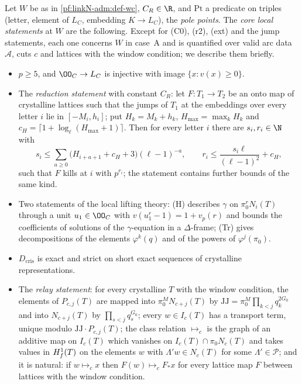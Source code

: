 \begin{definition}\label{pf:linkN-adm:def-cores}
Let $W$ be as in \cref{pf:linkN-adm:def-wc}, $C_R\in\R$, and $\mathrm{Pt}$ a predicate on triples (letter, element of
$L_C$, embedding $K\to L_C$), the \emph{pole points}. The \emph{core local statements} at $W$ are the following. Except
for (C0), (r2), (ext) and the jump statements, each one concerns $W$ in case~A and is quantified over valid arc data
$\mathcal A$, cuts $c$ and lattices with the window condition; we describe them briefly.
\begin{itemize}
\item[(C0)] $p\ge5$, and $\OO_C\to L_C$ is injective with image $\{x:v(x)\ge0\}$.
\item[(wr)] The \emph{reduction statement} with constant $C_R$: let $F\colon T_1\to T_2$ be an onto map of crystalline
  lattices such that the jumps of $T_1$ at the embeddings over every letter $i$ lie in $[-M_i,h_i]$; put $H_k=M_k+h_k$,
  $H_{\max}=\max_kH_k$ and $c_H=\lceil1+\log_\ell(H_{\max}+1)\rceil$. Then for every letter $i$ there are
  $s_i,r_i\in\N$ with
  \[
  s_i\le\sum_{a\ge0}\bigl(H_{i+a+1}+c_H+3\bigr)(\ell-1)^{-a},\qquad r_i\le\frac{s_i\ell}{(\ell-1)^2}+c_H,
  \]
  such that $F$ kills at $i$ with $p^{r_i}$; the statement contains further bounds of the same kind.
\item[(H), (Tr)] Two statements of the local lifting theory: (H) describes $\gamma$ on $\pi_0^rN_i(T)$ through a unit
  $u_1\in\OO_C$ with $v(u_1^r-1)=1+v_p(r)$ and bounds the coefficients of solutions of the $\gamma$-equation in a
  $\Delta$-frame; (Tr) gives decompositions of the elements $\varphi^k(q)$ and of the powers of $\varphi^j(\pi_0)$.
\item[(dc)] $D_{\mathrm{cris}}$ is exact and strict on short exact sequences of crystalline representations.
\item[(relay)] The \emph{relay statement}: for every crystalline $T$ with the window condition, the elements of
  $P_{c,j}(T)$ are mapped into $\pi_0^MN_{c+j}(T)$ by $\mathrm{JJ}=\pi_0^M\prod_{k<j}q_k^{2G_0}$ and into $N_{c+j}(T)$ by
  $\prod_{s<j}q_s^{G_0}$; every $w\in I_c(T)$ has a transport term, unique modulo $\mathrm{JJ}\cdot P_{c,j}(T)$; the class
  relation $\mapsto_c$ is the graph of an additive map on $I_c(T)$ which vanishes on $I_c(T)\cap\pi_0N_c(T)$ and takes
  values in $H^1_{f}(T)$ on the elements $w$ with $\Lambda'w\in N_c(T)$ for some $\Lambda'\in\mathcal P$; and it is
  natural: if $w\mapsto_cx$ then $F(w)\mapsto_cF_*x$ for every lattice map $F$ between lattices with the window condition.

\end{itemize}
\end{definition}
